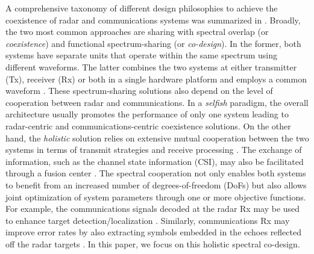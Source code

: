 \documentclass[10pt,journal]{IEEEtran}
\theoremstyle{definition}
\begin{document}
\color{black}
A comprehensive taxonomy of different design philosophies to achieve the coexistence of radar and communications systems was summarized in \cite{zheng2019overiview}. Broadly, the two most common approaches are sharing with spectral overlap (or \textit{coexistence}) and functional spectrum-sharing (or \textit{co-design}). In the former, both systems have separate units that operate within the same spectrum using different waveforms. %
The latter combines the two systems at either transmitter (Tx), receiver (Rx) or both in a single hardware platform and employs a common waveform %
\cite{mishra2019toward,liu2018mu,duggal2020doppler}%
. %
These spectrum-sharing solutions also depend on the level of cooperation between radar and communications. In a \textit{selfish} paradigm, the overall architecture usually promotes the performance of only one system leading to radar-centric \cite{alaee2019discrete,bao2019precoding,slavik2019cognitive,sedighi2020localization} and communications-centric \cite{ayyar2019robust} coexistence solutions. %
On the other hand, the \textit{holistic} solution relies on extensive mutual cooperation between the two systems in terms of transmit strategies and receive processing \cite{mahal2017spectral,MCMIMO_RadComm,qian2018joint,rihan2018optimum,Lops2019serveillance,biswas2018fdqos,he2019performance}. The exchange of information, such as the channel state information (CSI), may also be facilitated through a fusion center \cite{MCMIMO_RadComm,he2019performance}.
The spectral cooperation not only enables both systems to benefit from an increased number of degrees-of-freedom (DoFs) but also allows joint optimization of system parameters through one \cite{MCMIMO_RadComm,qian2018joint} or more \cite{biswas2018fdqos,dokhanchi2020multi} objective functions. For example, the communications signals decoded at the radar Rx may be used to enhance target detection/localization \cite{biswas2018fdqos,he2019performance}. Similarly, communications Rx may improve error rates by also extracting symbols embedded in the echoes reflected off the radar targets \cite{liu2018mimo}. In this paper, we focus on this holistic spectral co-design.
\end{document}
